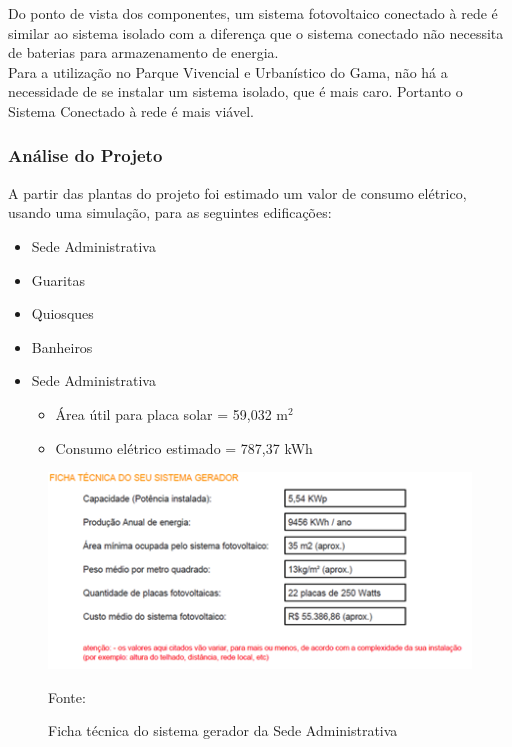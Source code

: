 Do ponto de vista dos componentes, um sistema fotovoltaico conectado \`a rede \'e similar ao sistema isolado com a diferen\c{c}a que o sistema conectado n\~ao necessita de baterias para armazenamento de energia.\\ 

Para a utiliza\c{c}\~ao no Parque Vivencial e Urban\'istico do Gama, n\~ao h\'a a necessidade de se instalar um sistema isolado, que \'e mais caro. Portanto o Sistema Conectado \`a rede \'e mais vi\'avel.

\subsubsection{An\'alise do Projeto}

A partir das plantas do projeto foi estimado um valor de consumo el\'etrico, usando uma simula\c{c}\~ao, para as seguintes edifica\c{c}\~oes:

 \begin{itemize}
        \item Sede Administrativa
	\item Guaritas
	\item Quiosques
	\item Banheiros
\end{itemize}

\begin{itemize}
      \item Sede Administrativa
             \begin{itemize}
                       \item \'Area \'util para placa solar	=	59,032 m$^{2}$ 
                       \item Consumo el\'etrico estimado	=	787,37 kWh 
	     \end{itemize}
\end{itemize}

\begin{figure}[H]
	 \centering
	 \label{SistemaGeradorSede}
	\includegraphics[keepaspectratio=true,scale=0.8]{figuras/SistemaGeradorSede.png}
	\caption{Ficha t\'ecnica do sistema gerador da Sede Administrativa}
	\small{Fonte: \cite{PortalSolar}}
\end{figure}


